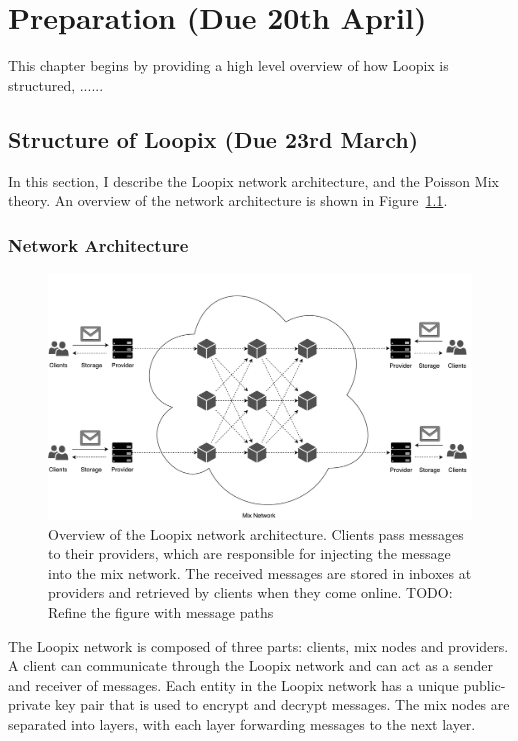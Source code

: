 \documentclass[final,dissertation.tex]{subfiles}
\begin{document}
\chapter{Preparation (Due 20th April)}

This chapter begins by providing a high level overview of how Loopix is structured, ......

\section{Structure of Loopix (Due 23rd March)}

In this section, I describe the Loopix network architecture, and the Poisson Mix theory. An overview of the network architecture is shown in Figure~\ref{fig:loopix_network}. 

\subsection{Network Architecture}

\begin{figure}[h]
	\includegraphics[width=\linewidth]{../figs/loopix_network}
	\caption{Overview of the Loopix network architecture. Clients pass messages to their providers, which are responsible for injecting the message into the mix network. The received messages are stored in inboxes at providers and retrieved by clients when they come online. TODO: Refine the figure with message paths }\label{fig:loopix_network}
\end{figure}

The Loopix network is composed of three parts: clients, mix nodes and providers. A client can communicate through the Loopix network and can act as a sender and receiver of messages. Each entity in the Loopix network has a unique public-private key pair that is used to encrypt and decrypt messages. The mix nodes are separated into layers, with each layer forwarding messages to the next layer. 
\end{document}
